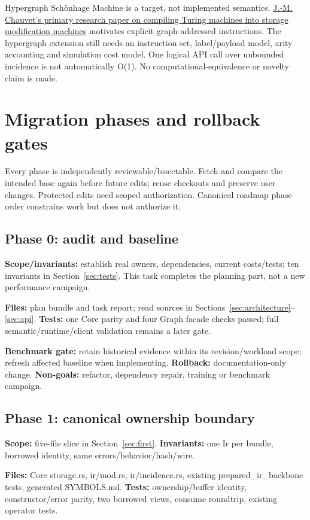 \documentclass[10pt,a4paper]{article}
\begin{document}
Hypergraph Sch\"onhage Machine is a target, not implemented semantics. \href{https://arxiv.org/html/2110.01415}{J.-M. Chauvet's primary research paper on compiling Turing machines into storage modification machines} motivates explicit graph-addressed instructions. The hypergraph extension still needs an instruction set, label/payload model, arity accounting and simulation cost model. One logical API call over unbounded incidence is not automatically O(1). No computational-equivalence or novelty claim is made.

\section{Migration phases and rollback gates}
\label{sec:phases}
Every phase is independently reviewable/bisectable. Fetch and compare the intended base again before future edits; reuse checkouts and preserve user changes. Protected edits need scoped authorization. Canonical roadmap phase order constrains work but does not authorize it.

\subsection{Phase 0: audit and baseline}
\textbf{Scope/invariants:} establish real owners, dependencies, current costs/tests; ten invariants in Section~\ref{sec:tests}. This task completes the planning part, not a new performance campaign.

\textbf{Files:} plan bundle and task report; read sources in Sections~\ref{sec:architecture}--\ref{sec:api}. \textbf{Tests:} one Core parity and four Graph facade checks passed; full semantic/runtime/client validation remains a later gate.

\textbf{Benchmark gate:} retain historical evidence within its revision/workload scope; refresh affected baseline when implementing. \textbf{Rollback:} documentation-only change. \textbf{Non-goals:} refactor, dependency repair, training or benchmark campaign.

\subsection{Phase 1: canonical ownership boundary}
\textbf{Scope:} five-file slice in Section~\ref{sec:first}. \textbf{Invariants:} one Ir per bundle, borrowed identity, same errors/behavior/hash/wire.

\textbf{Files:} Core storage.rs, ir/mod.rs, ir/incidence.rs, existing prepared\_ir\_backbone tests, generated SYMBOLS.md. \textbf{Tests:} ownership/buffer identity, constructor/error parity, two borrowed views, consume roundtrip, existing operator tests.
\end{document}
